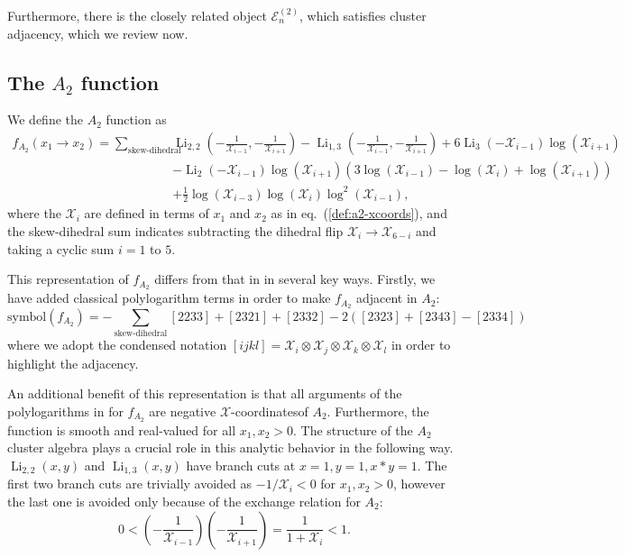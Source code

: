 \documentclass[11pt]{article}
\DeclareMathOperator{\Li}{Li}
\def\x{\mathcal{X}}
\def\xcoords{$\mathcal{X}$-coordinates}
\def\pdfeq#1{\texorpdfstring{$#1$}{a}}
\begin{document}
Furthermore, there is the closely related object $\mathcal{E}^{(2)}_n$, which satisfies cluster adjacency, which we review now.

\subsection{The \pdfeq{A_2} function}
We define the $A_2$ function as
\begin{equation}\label{def:a2-function}
\begin{split}
	f_{A_2}(x_1 \to x_2)  = \sum_{\text{skew-dihedral}} &\Li_{2,2}\left(-\frac{1}{\x_{i-1}},-\frac{1}{\x_{i+1}}\right) - \Li_{1,3}\left(-\frac{1}{\x_{i-1}},-\frac{1}{\x_{i+1}}\right)+6 \Li_3\left(-\x_{i-1}\right) \log \left(\x_{i+1}\right)
	\\&-\Li_2\left(-\x_{i-1}\right) \log \left(\x_{i+1}\right) \left(3 \log \left(\x_{i-1}\right)-\log \left(\x_i\right)+\log \left(\x_{i+1}\right)\right)
	\\&+\frac{1}{2} \log \left(\x_{i-3}\right) \log \left(\x_i\right) \log^2\! \left(\x_{i-1}\right),
\end{split}
\end{equation}
where the $\x_i$ are defined in terms of $x_1$ and $x_2$ as in eq.~(\ref{def:a2-xcoords}), and the skew-dihedral sum indicates subtracting the dihedral flip $\x_i \to \x_{6-i}$ and taking a cyclic sum $i=1$ to $5$.

This representation of $f_{A_2}$ differs from that in \cite{Golden:2014xqa} in several key ways. Firstly, we have added classical polylogarithm terms in order to make $f_{A_2}$ adjacent in $A_2$:
\begin{equation}
   \text{symbol}(f_{A_2}) = -\sum_{\text{skew-dihedral}}[2233]+[2321]+[2332]-2([2323]+[2343]-[2334])
\end{equation}
where we adopt the condensed notation $[ijkl] = \x_i\otimes\x_j\otimes\x_k\otimes\x_l$ in order to highlight the adjacency. 

An additional benefit of this representation is that all arguments of the polylogarithms in for $f_{A_2}$ are negative \xcoords of $A_2$. Furthermore, the function is smooth and real-valued for all $x_1, x_2>0$. The structure of the $A_2$ cluster algebra plays a crucial role in this analytic behavior in the following way. $\Li_{2,2}(x,y)$ and $\Li_{1,3}(x,y)$ have branch cuts at $x=1,y=1, x*y=1$. The first two branch cuts are trivially avoided as $-1/\x_i<0$ for $x_1,x_2>0$, however the last one is avoided only because of the exchange relation for $A_2$: 
\begin{equation}
	0<\left(-\frac{1}{\x_{i-1}}\right)\left(-\frac{1}{\x_{i+1}}\right) = \frac{1}{1+\x_i}<1.
\end{equation}
\end{document}
